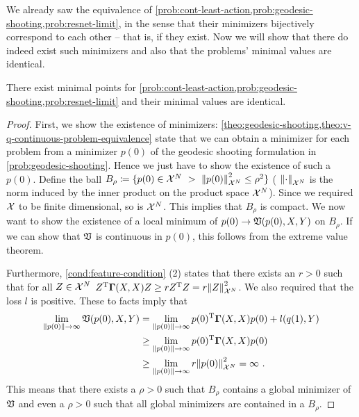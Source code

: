 We already saw the equivalence of \cref{prob:cont-least-action,prob:geodesic-shooting,prob:resnet-limit}, in the sense that their minimizers bijectively correspond to each other -- that is, if they exist.
Now we will show that there do indeed exist such minimizers and also that the problems' minimal values are identical.
\begin{theorem}
	\label{theo:continuous-solutions-existence}
		There exist minimal points for \cref{prob:cont-least-action,prob:geodesic-shooting,prob:resnet-limit} and their minimal values are identical.
\end{theorem}

\begin{proof}
	First, we show the existence of minimizers:
	\cref{theo:geodesic-shooting,theo:v-q-continuous-problem-equivalence} state that we can obtain a minimizer for each problem from a minimizer $p(0)$ of the geodesic shooting formulation in \cref{prob:geodesic-shooting}.
	Hence we just have to show the existence of such a $p(0)$.
	Define the ball $B_\rho \coloneqq \{p(0) \in \mathcal{X}^N\ > \ \norm{p(0)}_{\mathcal{X}^N}^2 \leq \rho^2 \}$ ( $\norm{\cdot}_{\mathcal{X}^N}$ is the norm induced by the inner product on the product space $\mathcal{X}^N$).
	Since we required $\mathcal{X}$ to be finite dimensional, so is $\mathcal{X}^N$.
	This implies that $B_\rho$ is compact.
	We now want to show the existence of a local minimum of $p(0) \rightarrow \mathfrak{V}(p(0), X, Y)$ on $B_\rho$.
	If we can show that $\mathfrak{V}$ is continuous in $p(0)$, this follows from the extreme value theorem.
	
	Furthermore, \cref{cond:feature-condition} (2) states that there exists an $r > 0$ such that for all $Z \in \mathcal{X}^N$ $Z^{\mathrm{T}} \mathbf{\Gamma}(X, X) Z \geq r Z^{\mathrm{T}} Z = r \norm{Z}_{\mathcal{X}^N}^2$.
	We also required that the loss $l$ is positive.
	These to facts imply that
	\begin{align}
		\lim_{\norm{p(0)} \rightarrow \infty} \mathfrak{V}(p(0), X, Y) 
		&= \lim_{\norm{p(0)} \rightarrow \infty} p(0)^{\mathrm{T}} \mathbf{\Gamma}(X, X) p(0) + l(q(1), Y)\\
		& \geq 	\lim_{\norm{p(0)} \rightarrow \infty} p(0)^{\mathrm{T}} \mathbf{\Gamma}(X, X) p(0) \\
		& \geq \lim_{\norm{p(0)} \rightarrow \infty} r \norm{p(0)}_{\mathcal{X}^N}^2
		= \infty \ .
	\end{align}
	This means that there exists a $\rho > 0$ such that $B_\rho$ contains a global minimizer of $\mathfrak{V}$ and even a $\rho > 0$ such that all global minimizers are contained in a $B_\rho$.
	

\end{proof}
